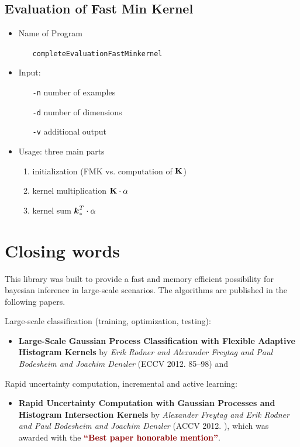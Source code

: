 \documentclass[a4paper]{scrreprt}
\begin{document}
\section{Evaluation of Fast Min Kernel}
\begin{itemize}
 \item Name of Program
    \begin{itemize}
      \item[ ] \texttt{completeEvaluationFastMinkernel}
    \end{itemize}
 \item Input:
    \begin{itemize}
      \item[\texttt{-n}] number of examples
      \item[\texttt{-d}] number of dimensions
      \item[\texttt{-v}] additional output
    \end{itemize}
 \item Usage: three main parts
    \begin{enumerate}
      \item initialization (FMK vs. computation of $\mathbf{K}$)
      \item kernel multiplication $\mathbf{K} \cdot \alpha $
      \item kernel sum $\mathbf{\boldsymbol{k}}_{*}^T \cdot \alpha $
    \end{enumerate}
\end{itemize}

\chapter{Closing words}
This library was built to provide a fast and memory efficient possibility for bayesian inference in large-scale scenarios. 
The algorithms are published in the following papers.
\vspace{1em}

Large-scale classification (training, optimization, testing):
\begin{itemize}
  \item \textbf{Large-Scale Gaussian Process Classification with Flexible Adaptive Histogram Kernels} by \textit{Erik Rodner and Alexander Freytag and Paul Bodesheim and Joachim Denzler} (ECCV 2012. 85--98) and
\end{itemize}
Rapid uncertainty computation, incremental and active learning:
\begin{itemize}
  \item \textbf{Rapid Uncertainty Computation with Gaussian Processes and Histogram Intersection Kernels} by \textit{Alexander Freytag and Erik Rodner and Paul Bodesheim and Joachim Denzler} (ACCV 2012. ), which was awarded with the \textcolor{darkred}{\bf ``Best paper honorable mention''}.
\end{itemize}
\end{document}
